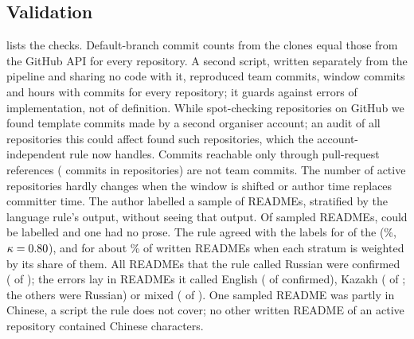 \documentclass{article}
\begin{document}
\subsection{Validation}\label{sec:validation}
 lists the checks. Default-branch commit counts from the clones equal those from the GitHub API for every repository. A second script, written separately from the pipeline and sharing no code with it, reproduced team commits, window commits and hours with commits for every repository; it guards against errors of implementation, not of definition. While spot-checking repositories on GitHub we found template commits made by a second organiser account; an audit of all \NValidationTemplateAuditN{} repositories this could affect found \NValidationTemplateFixes{} such repositories, which the account-independent rule now handles. Commits reachable only through pull-request references (\NValidationPrOnlyCommits{} commits in \NValidationPrOnlyRepos{} repositories) are not team commits. The number of active repositories hardly changes when the window is shifted or author time replaces committer time. The author labelled a sample of READMEs, stratified by the language rule's output, without seeing that output. Of \NValidationReadmeSampleN{} sampled READMEs, \NValidationReadmeSampleLabelled{} could be labelled and one had no prose. The rule agreed with the labels for \NValidationReadmeSampleAgree{} of the \NValidationReadmeSampleLabelled{} (\NValidationReadmeSampleAgreePct\%, $\kappa = \num{0.80}$), and for about \NValidationReadmeSampleWeightedAcc\% of written READMEs when each stratum is weighted by its share of them. All READMEs that the rule called Russian were confirmed (\NValidationReadmeSampleAgreeRussianN{} of \NValidationReadmeSampleAgreeRussianOf); the errors lay in READMEs it called English (\NValidationReadmeSampleAgreeEnglishN{} of \NValidationReadmeSampleAgreeEnglishOf{} confirmed), Kazakh (\NValidationReadmeSampleAgreeKazakhN{} of \NValidationReadmeSampleAgreeKazakhOf; the others were Russian) or mixed (\NValidationReadmeSampleAgreeMixedN{} of \NValidationReadmeSampleAgreeMixedOf). One sampled README was partly in Chinese, a script the rule does not cover; no other written README of an active repository contained Chinese characters.
\end{document}
